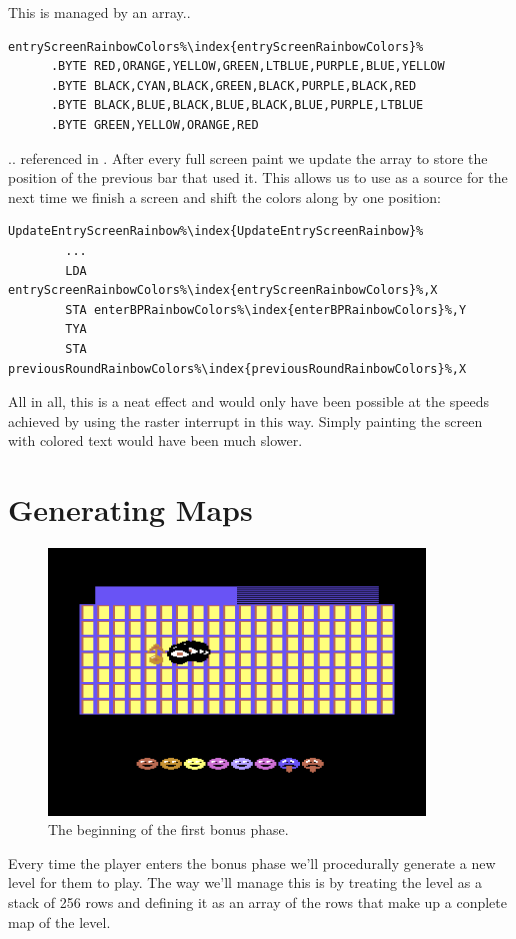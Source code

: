 This is managed by an array..

\begin{lstlisting}[escapechar=\%]
entryScreenRainbowColors%\index{entryScreenRainbowColors}%
      .BYTE RED,ORANGE,YELLOW,GREEN,LTBLUE,PURPLE,BLUE,YELLOW
      .BYTE BLACK,CYAN,BLACK,GREEN,BLACK,PURPLE,BLACK,RED
      .BYTE BLACK,BLUE,BLACK,BLUE,BLACK,BLUE,PURPLE,LTBLUE
      .BYTE GREEN,YELLOW,ORANGE,RED
\end{lstlisting}

.. referenced in . After every full screen paint we update the 
array  to store the position of the previous bar that used it.
This allows us to use  as a source for  the next time
we finish a screen and shift the colors along by one position:

\begin{lstlisting}[escapechar=\%]
UpdateEntryScreenRainbow%\index{UpdateEntryScreenRainbow}%   
        ...
        LDA entryScreenRainbowColors%\index{entryScreenRainbowColors}%,X
        STA enterBPRainbowColors%\index{enterBPRainbowColors}%,Y
        TYA 
        STA previousRoundRainbowColors%\index{previousRoundRainbowColors}%,X
\end{lstlisting}

All in all, this is a neat effect and would only have been possible at the speeds achieved by using
the raster interrupt in this way. Simply painting the screen with colored text would have been much
slower.

\section{Generating Maps}
\begin{figure}[H]
    \centering
      \includegraphics[width=10cm]{src/bonusphase/bonus_phase.png}%
\caption{The beginning of the first bonus phase.}
\end{figure}
Every time the player enters the bonus phase we'll procedurally generate a 
new level for them to play. The way we'll manage this is by treating the level as a stack of 
256 rows and defining it as an array of the rows that 
make up a conplete map of the level.

